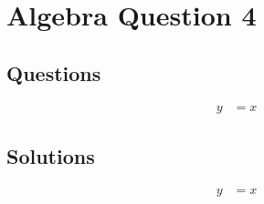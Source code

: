\chapter{Algebra Question 4}
\label{chap:aq4}

\section{Questions}
\label{sec:aq4q}
\begin{align}
  y &= x
\end{align}

\section{Solutions}
\label{sec:aq4s}
\begin{align}
  y &= x
\end{align}